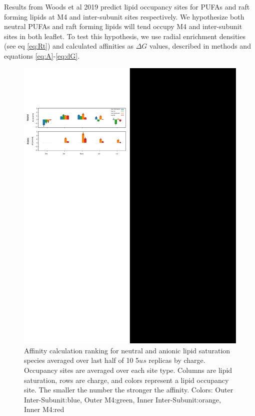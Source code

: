Results from Woods et al 2019 \cite{Woods2019} predict lipid occupancy sites for PUFAs and raft forming lipids at M4 and inter-subunit sites respectively. We hypothesize both neutral PUFAs and raft forming lipids will tend occupy M4 and inter-subunit sites in both leaflet. To test this hypothesis, we use radial enrichment densities (see eq \ref{eq:Rt}) and calculated affinities as $\Delta G$ values, described in methods and equations \ref{eq:A}-\ref{eq:dG}.

\begin{figure}[!h]
	\center
	\includegraphics[width=\linewidth]{Figures/Protein_centric.pdf}
	\caption[Affinity calculation ranking for neutral and anionic lipid saturation species averaged over last half of 10 5$us$ replicas by charge.] {Affinity calculation ranking for neutral and anionic lipid saturation species averaged over last half of 10 5$us$ replicas by charge. Occupancy sites are averaged over each site type. Columns are lipid saturation, rows are charge, and colors represent a lipid occupancy site. The smaller the number the stronger the affinity.  Colors: Outer Inter-Subunit:blue, Outer M4:green, Inner Inter-Subunit:orange, Inner M4:red}
	\label{fig:proBar}
\end{figure}

